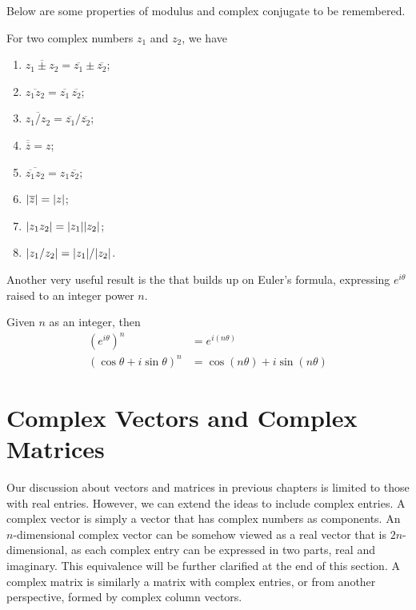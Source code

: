 Below are some properties of modulus and complex conjugate to be remembered.
\begin{proper}
\label{proper:complexnum}
For two complex numbers $z_1$ and $z_2$, we have
\begin{enumerate}[label=(\alph*)]
\item $\overline{z_1 \pm z_2} = \overline{z_1} \pm \overline{z_2}$;
\item $\overline{z_1z_2} = \overline{z_1}\,\overline{z_2}$;
\item $\overline{z_1/z_2} = \overline{z_1}/\overline{z_2}$;
\item $\overline{\overline{z}} = z$;
\item $\overline{\overline{z_1}z_2} = z_1\overline{z_2}$;
\item $\abs{\overline{z}} = \abs{z}$;
\item $\abs{z_1z_2} = \abs{z_1}\abs{z_2}$;
\item $\abs{z_1/z_2} = \abs{z_1}/\abs{z_2}$.
\end{enumerate}
\end{proper}
Another very useful result is the  that builds up on Euler's formula, expressing $e^{i \theta}$ raised to an integer power $n$.
\begin{thm}
Given $n$ as an integer, then
\begin{subequations}
\begin{align}
(e^{i \theta})^n &= e^{i (n\theta)} \\
(\cos\theta + i \sin\theta)^n &= \cos(n\theta) + i \sin(n\theta)
\end{align}
\end{subequations}
\end{thm}

\section{Complex Vectors and Complex Matrices}

Our discussion about vectors and matrices in previous chapters is limited to those with real entries. However, we can extend the ideas to include complex entries. A complex vector is simply a vector that has complex numbers as components. An $n$-dimensional complex vector can be somehow viewed as a real vector that is $2n$-dimensional, as each complex entry can be expressed in two parts, real and imaginary. This equivalence will be further clarified at the end of this section. A complex matrix is similarly a matrix with complex entries, or from another perspective, formed by complex column vectors.

